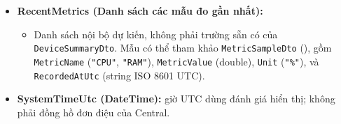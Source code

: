 \documentclass[12pt,a4paper]{article}
\begin{document}
\begin{itemize}
\begin{itemize}
      \item \texttt{ConditionState} (string): Giá trị thiết kế theo ADR (DTO hiện chú thích ACTIVE/RECOVERED; UNKNOWN cần B/C xác minh ánh xạ trước tích hợp): \texttt{"ACTIVE"}, \texttt{"RECOVERED"}, hoặc \texttt{"UNKNOWN"}.
      \item \texttt{WorkflowState} (string): Nhãn thiết kế quy trình; DTO/đặc tả đang khác tên như ghi chú đối chiếu bên dưới: \texttt{"OPEN"}, \texttt{"ACKNOWLEDGED"}, \texttt{"INVESTIGATING"} (hoặc \texttt{"IN\_PROGRESS"}), \texttt{"RESOLVED"}.
      \item \texttt{OccurrenceCount} (int): Số lần điều kiện cảnh báo lặp lại.
      \item \texttt{OpenedAtUtc} (string, bắt buộc): Thời điểm sự cố được ghi nhận lần đầu.
      \item \texttt{RowVersionHex} (string, bắt buộc): Chuỗi hex 18 ký tự đại diện cho token phiên bản SQL Server OCC (ví dụ: \texttt{"0x0000000000000001"}).
    \end{itemize}
  \item \textbf{RecentMetrics (Danh sách các mẫu đo gần nhất):}
    \begin{itemize}
      \item Danh sách nội bộ dự kiến, không phải trường sẵn có của \texttt{DeviceSummaryDto}. Mẫu có thể tham khảo \texttt{MetricSampleDto} (), gồm \texttt{MetricName} (\texttt{"CPU"}, \texttt{"RAM"}), \texttt{MetricValue} (double), \texttt{Unit} (\texttt{"\%"}), và \texttt{RecordedAtUtc} (string ISO 8601 UTC).
    \end{itemize}
  \item \textbf{SystemTimeUtc (DateTime):} giờ UTC dùng đánh giá hiển thị; không phải đồng hồ đơn điệu của Central.
\end{itemize}
\end{document}
